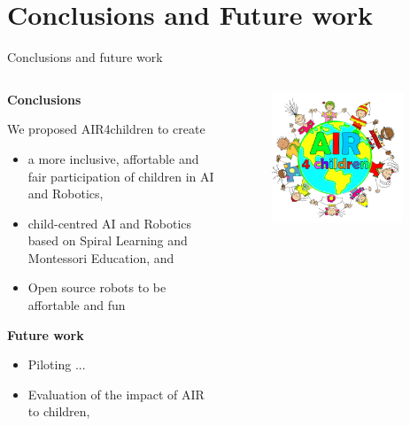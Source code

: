 \section{Conclusions and Future work}

{
\begin{frame}{Conclusions and future work}

  \begin{columns}
  \begin{column}{.75\linewidth}

  \textbf{Conclusions}   

  We proposed AIR4children to create
  \begin{itemize}
    \item a more inclusive, affortable and fair participation of children in AI and Robotics,
    \item child-centred AI and Robotics based on Spiral Learning and Montessori Education, and
    \item Open source robots to be affortable and fun 
  \end{itemize}

  \textbf{Future work}
  \begin{itemize}
    \item Piloting ...
    \item Evaluation of the impact of AIR to children,
  \end{itemize}

    \end{column}


  \begin{column}{.3\linewidth}

      \begin{figure}
        \centering
        \includegraphics[width=0.9\textwidth]{./figures/future-work/versions/drawing-v00.png}
      \end{figure}


\end{column}
\end{columns}
\end{frame}}
